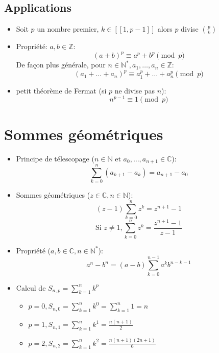 \documentclass[fleqn]{article}
\theoremstyle{definition} \newtheorem*{defi}{D\'efinition}
\theoremstyle{definition} \newtheorem*{theo}{Th\'eor\`eme}
\theoremstyle{definition} \newtheorem*{prop}{Propri\'et\'e}
\begin{document}
\subsection{Applications}
\begin{itemize}
	\item Soit \(p\) un nombre premier, \(k \in [\![1,p-1]\!]\) alors \(p\) divise \(\binom{p}{k}\)
	\item Propri\'{e}t\'{e}: \(a,b \in \mathbb{Z}\):
		\[(a+b)^p \equiv a^p + b^p \pmod{p}\]
		De fa\c{c}on plus g\'en\'erale, pour \(n \in \mathbb{N}^*, a_1, \hdots, a_n \in \mathbb{Z}\):
		\[(a_1+\hdots+a_n)^p \equiv a_1^p+\hdots+a_n^p \pmod{p}\]
	\item petit th\'eor\`eme de Fermat (si \(p\) ne divise pas \(n\)):
		\[n^{p-1} \equiv 1\pmod{p} \]
\end{itemize}

\section{Sommes g\'eom\'etriques}
\begin{itemize}
	\item Principe de t\'elescopage (\(n \in \mathbb{N}\) et \(a_0, \hdots, a_{n+1} \in \mathbb{C}\)):
		\[\sum_{k=0}^{n} (a_{k+1} - a_k) = a_{n+1} - a_0\]
	\item Sommes g\'eom\'etriques (\(z \in \mathbb{C}, n \in \mathbb{N}\)):
		\[(z-1)\sum_{k=0}^{n}z^k = z^{n+1} -1\]
		\[\text{Si } z \neq 1, \sum_{k=0}^{n}z^k=\frac{z^{n+1}-1}{z-1}\]
	\item Propri\'{e}t\'{e} (\(a,b \in \mathbb{C}, n \in \mathbb{N}^*\)):
		\[a^n-b^n = (a-b)\sum_{k=0}^{n-1}a^kb^{n-k-1}\]
	\item Calcul de \(S_{n,p} = \sum_{k=1}^{n}k^p\)
		\begin{itemize}
			\item \(p = 0, S_{n,0} = \sum_{k=1}^{n}k^0 = \sum_{k=1}^{n}1 = n\)
			\item \(p = 1, S_{n,1} = \sum_{k=1}^{n}k^1 = \frac{n(n+1)}{2} \)
			\item \(p = 2, S_{n,2} = \sum_{k=1}^{n}k^2 = \frac{n(n+1)(2n+1)}{6} \)
		\end{itemize}
\end{itemize}
\end{document}
